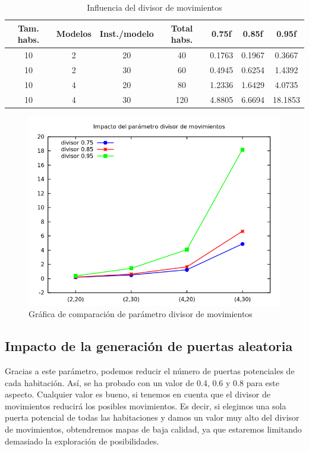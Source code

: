 \begin{table}[H]
\begin{center}
	\begin{tabular}{ | c | c | c | c | c | c | c | }
\hline
Tam. habs. & Modelos & Inst./modelo & Total habs. & 0.75f & 0.85f & 0.95f\\ \hline 
10 & 2 & 20 & 40 & 0.1763 & 0.1967 & 0.3667 \\ 
10 & 2 & 30 & 60 & 0.4945 & 0.6254 & 1.4392 \\ 
10 & 4 & 20 & 80 & 1.2336 & 1.6429 & 4.0735 \\ 
10 & 4 & 30 & 120 & 4.8805 & 6.6694 & 18.1853 \\ 
\hline
	\end{tabular}
\end{center}
\caption{Influencia del divisor de movimientos}
\label{table:dpediv}
\end{table}


\begin{figure}[H]
\centering
\includegraphics[scale=0.5]{img/dpedivs}
\caption{Gráfica de comparación de parámetro divisor de movimientos
\label{fig:grfdpedivs}}
\end{figure}



\subsection{Impacto de la generación de puertas aleatoria}

Gracias a este parámetro, podemos reducir el número de puertas potenciales de cada habitación. Así, se ha probado con un valor de 0.4, 0.6 y 0.8 para este aspecto. Cualquier valor es bueno, si tenemos en cuenta que el divisor de movimientos reducirá los posibles movimientos. Es decir, si elegimos una sola puerta potencial de todas las habitaciones y damos un valor muy alto del divisor de movimientos, obtendremos mapas de baja calidad, ya que estaremos limitando demasiado la exploración de posibilidades.

